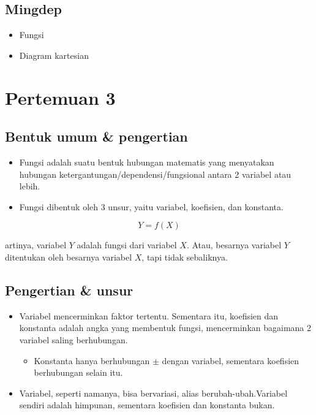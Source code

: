\documentclass[
  letterpaper,
  DIV=11,
  numbers=noendperiod]{scrartcl}
\providecommand{\tightlist}{%
  \setlength{\itemsep}{0pt}\setlength{\parskip}{0pt}}\usepackage{longtable,booktabs,array}
\begin{document}
\hypertarget{mingdep-1}{%
\subsection{Mingdep}\label{mingdep-1}}

\begin{itemize}
\item
  Fungsi
\item
  Diagram kartesian
\end{itemize}

\hypertarget{pertemuan-3}{%
\section{Pertemuan 3}\label{pertemuan-3}}

\hypertarget{bentuk-umum-pengertian}{%
\subsection{Bentuk umum \& pengertian}\label{bentuk-umum-pengertian}}

\begin{itemize}
\item
  Fungsi adalah suatu bentuk hubungan matematis yang menyatakan hubungan
  ketergantungan/dependensi/fungsional antara 2 variabel atau lebih.
\item
  Fungsi dibentuk oleh 3 unsur, yaitu variabel, koefisien, dan
  konstanta.
\end{itemize}

\[
Y=f(X)
\]

artinya, variabel \(Y\) adalah fungsi dari variabel \(X\). Atau,
besarnya variabel \(Y\) ditentukan oleh besarnya variabel \(X\), tapi
tidak sebaliknya.

\hypertarget{pengertian-unsur}{%
\subsection{Pengertian \& unsur}\label{pengertian-unsur}}

\begin{itemize}
\item
  Variabel mencerminkan faktor tertentu. Sementara itu, koefisien dan
  konstanta adalah angka yang membentuk fungsi, mencerminkan bagaimana 2
  variabel saling berhubungan.

  \begin{itemize}
  \tightlist
  \item
    Konstanta hanya berhubungan \(\pm\) dengan variabel, sementara
    koefisien berhubungan selain itu.
  \end{itemize}
\item
  Variabel, seperti namanya, bisa bervariasi, alias
  berubah-ubah.Variabel sendiri adalah himpunan, sementara koefisien dan
  konstanta bukan.
\end{itemize}
\end{document}
